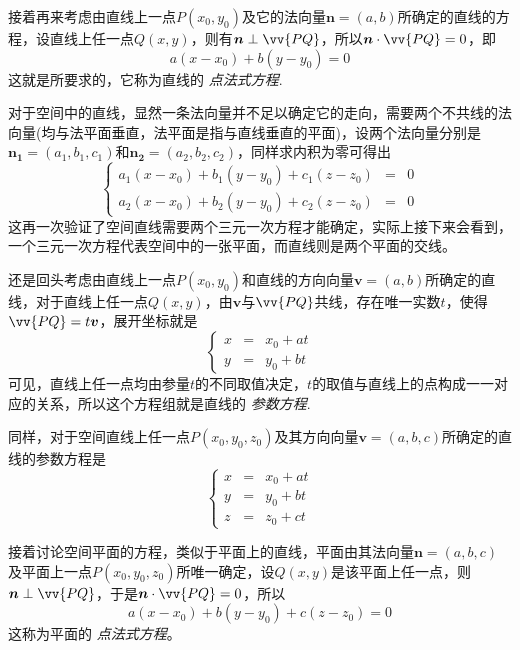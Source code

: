 接着再来考虑由直线上一点$P(x_0,y_0)$及它的法向量$\bm{n}=(a,b)$所确定的直线的方程，设直线上任一点$Q(x,y)$，则有$\bm{n} \perp \vv{PQ}$，所以$\bm{n} \cdot \vv{PQ} = 0$，即
\[ a(x-x_0)+b(y-y_0)=0 \]
这就是所要求的，它称为直线的 \emph{点法式方程}.

对于空间中的直线，显然一条法向量并不足以确定它的走向，需要两个不共线的法向量(均与法平面垂直，法平面是指与直线垂直的平面)，设两个法向量分别是$\bm{n_1}=(a_1,b_1,c_1)$和$\bm{n_2}=(a_2,b_2,c_2)$，同样求内积为零可得出
\[ \left\{
    \begin{array}{lll}
      a_1(x-x_0) + b_1(y-y_0) + c_1(z-z_0) & = & 0 \\
      a_2(x-x_0) + b_2(y-y_0) + c_2(z-z_0) & = & 0
    \end{array}
  \right. \]
这再一次验证了空间直线需要两个三元一次方程才能确定，实际上接下来会看到，一个三元一次方程代表空间中的一张平面，而直线则是两个平面的交线。

还是回头考虑由直线上一点$P(x_0,y_0)$和直线的方向向量$\bm{v}=(a,b)$所确定的直线，对于直线上任一点$Q(x,y)$，由$\bm{v}$与$\vv{PQ}$共线，存在唯一实数$t$，使得$\vv{PQ}=t\bm{v}$，展开坐标就是
\[ \left\{
    \begin{array}{lll}
      x & = & x_0 + at \\
      y & = & y_0 + bt
    \end{array}
  \right. \]
可见，直线上任一点均由参量$t$的不同取值决定，$t$的取值与直线上的点构成一一对应的关系，所以这个方程组就是直线的 \emph{参数方程}.

同样，对于空间直线上任一点$P(x_0,y_0,z_0)$及其方向向量$\bm{v}=(a,b,c)$所确定的直线的参数方程是
\[ \left\{
    \begin{array}{lll}
      x & = & x_0 + at \\
      y & = & y_0 + bt \\
      z & = & z_0 + ct
    \end{array}
  \right. \]

接着讨论空间平面的方程，类似于平面上的直线，平面由其法向量$\bm{n}=(a,b,c)$及平面上一点$P(x_0,y_0,z_0)$所唯一确定，设$Q(x,y)$是该平面上任一点，则$\bm{n} \perp \vv{PQ}$，于是$\bm{n} \cdot \vv{PQ}=0$，所以
\[ a(x-x_0)+b(y-y_0)+c(z-z_0)=0 \]
这称为平面的 \emph{点法式方程}。

